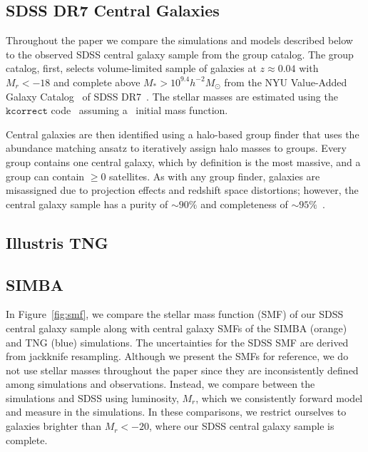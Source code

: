\subsection{SDSS DR7 Central Galaxies} \label{sec:obs} 
Throughout the paper we compare the simulations and models described below
to the observed SDSS central galaxy sample from the \cite{tinker2011} group
catalog. The group catalog, first, selects volume-limited sample of galaxies at
$z \approx 0.04$ with $M_r < -18$ and complete above $M_* > 10^{9.4}
h^{-2}M_\odot$ from the NYU Value-Added Galaxy
Catalog~\citep[VAGC;][]{blanton2005} of SDSS DR7~\citep{abazajian2009}. The
stellar masses are estimated using the $\mathtt{kcorrect}$
code~\citep{blanton2007a} assuming a~\cite{chabrier2003} initial mass
function. 

Central galaxies are then identified using a halo-based group finder that uses
the abundance matching ansatz to iteratively  assign halo masses to groups.
Every group contains one central galaxy, which by definition is the most
massive, and a group can contain $\ge0$ satellites. As with any group finder,
galaxies are misassigned due to projection effects and redshift space
distortions; however, the central galaxy sample has a purity of ${\sim}90\%$
and completeness of ${\sim}95\%$~\citep{tinker2018}. 

\subsection{Illustris TNG} \label{sec:tng}

\subsection{SIMBA} \label{sec:simba}

In Figure~\ref{fig:smf}, we compare the stellar mass function (SMF) of our SDSS
central galaxy sample along with central galaxy SMFs of the SIMBA (orange) and
TNG (blue) simulations. The uncertainties for the SDSS SMF are derived from
jackknife resampling. Although we present the SMFs for reference, we do not use
stellar masses throughout the paper since they are inconsistently defined among
simulations and observations. Instead, we compare between the simulations and
SDSS using luminosity, $M_r$, which we consistently forward model and measure
in the simulations. In these comparisons, we restrict ourselves to galaxies
brighter than $M_r < -20$, where our SDSS central galaxy sample is complete. 

